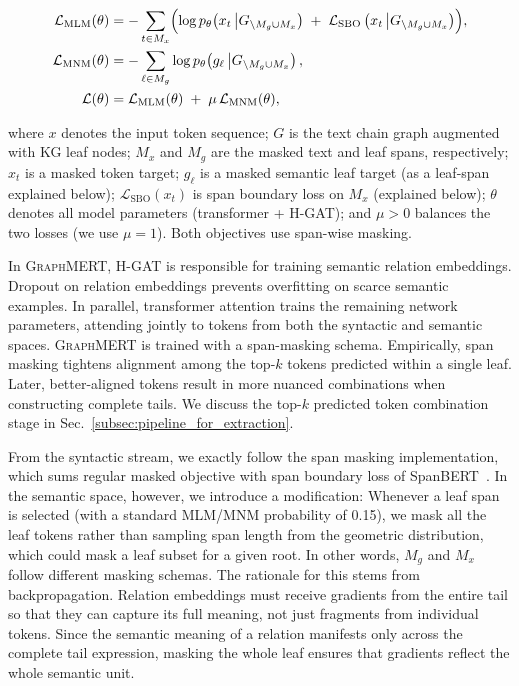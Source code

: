\documentclass[10pt]{article}
\newcommand{\ours}{\textsc{GraphMERT}\xspace}
\begin{document}
\begin{align}
\mathcal{L}_{\text{MLM}}(\theta)
&= - \sum_{t \in M_x} \Bigl( \log p_\theta\!\left(x_t \,\middle| G_{\setminus M_g \cup M_x}\right) \;+\; \mathcal{L}_{\text{SBO}}\left(x_t \,\middle| G_{\setminus M_g \cup M_x}\right) \Bigr), \\
\mathcal{L}_{\text{MNM}}(\theta)
&= - \sum_{\ell \in M_g} \log p_\theta\!\left(g_\ell \,\middle| G_{\setminus M_g \cup M_x}\right), \\
\mathcal{L}(\theta)
&= \mathcal{L}_{\text{MLM}}(\theta) \;+\; \mu\,\mathcal{L}_{\text{MNM}}(\theta),
\end{align}

\noindent
where \(x\) denotes the input token sequence; \(G\) is the text chain graph augmented with KG leaf nodes; \(M_x\) and \(M_g\) are the masked text and leaf spans, respectively; \(x_t\) is a masked token target; \(g_\ell\) is a masked semantic leaf target (as a leaf-span explained below); $\mathcal{L}_{\text{SBO}}(x_t)$ is span boundary loss on $M_x$ (explained below); \(\theta\) denotes all model parameters (transformer + H-GAT); and \(\mu>0\) balances the two losses (we use $\mu = 1$). Both objectives use span-wise masking.

In \ours, H-GAT is responsible for training semantic relation embeddings. Dropout on relation embeddings prevents overfitting on scarce semantic examples. In parallel, transformer attention trains the remaining network parameters, attending jointly to tokens from both the syntactic and semantic spaces. \ours is trained with a span-masking schema. Empirically, span masking tightens alignment among the top-$k$ tokens predicted within a single leaf. Later, better-aligned tokens result in more nuanced combinations when constructing complete tails. We discuss the top-$k$ predicted token combination stage in Sec.~\ref{subsec:pipeline_for_extraction}.

From the syntactic stream, we exactly follow the span masking implementation, which sums regular masked objective with span boundary loss of SpanBERT~\cite{joshi-etal-2020-spanbert}. In the semantic space, however, we introduce a modification: Whenever a leaf span is selected (with a standard MLM/MNM probability of 0.15), we mask all the leaf tokens rather than sampling span length from the geometric distribution, which could mask a leaf subset for a given root. In other words, $M_g$ and $M_x$ follow different masking schemas. The rationale for this stems from backpropagation. Relation embeddings must receive gradients from the entire tail so that they can capture its full meaning, not just fragments from individual tokens. Since the semantic meaning of a relation manifests only across the complete tail expression, masking the whole leaf ensures that gradients reflect the whole semantic unit.  
\end{document}
